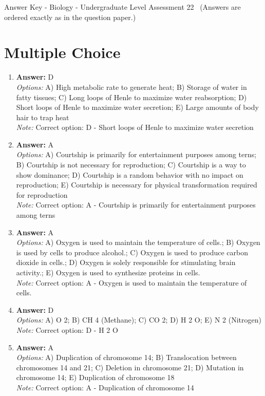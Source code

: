 \documentclass[12pt]{article}
\begin{document}
\begin{center}
Answer Key - Biology - Undergraduate Level Assessment 22 \
\small (Answers are ordered exactly as in the question paper.)
\end{center}

\section*{Multiple Choice}
\begin{enumerate}[label=\arabic*.]
\item \textbf{Answer:} D
\\ \textit{Options:} A) High metabolic rate to generate heat; B) Storage of water in fatty tissues; C) Long loops of Henle to maximize water reabsorption; D) Short loops of Henle to maximize water secretion; E) Large amounts of body hair to trap heat
\\ \textit{Note:} Correct option: D - Short loops of Henle to maximize water secretion
\item \textbf{Answer:} A
\\ \textit{Options:} A) Courtship is primarily for entertainment purposes among terns; B) Courtship is not necessary for reproduction; C) Courtship is a way to show dominance; D) Courtship is a random behavior with no impact on reproduction; E) Courtship is necessary for physical transformation required for reproduction
\\ \textit{Note:} Correct option: A - Courtship is primarily for entertainment purposes among terns
\item \textbf{Answer:} A
\\ \textit{Options:} A) Oxygen is used to maintain the temperature of cells.; B) Oxygen is used by cells to produce alcohol.; C) Oxygen is used to produce carbon dioxide in cells.; D) Oxygen is solely responsible for stimulating brain activity.; E) Oxygen is used to synthesize proteins in cells.
\\ \textit{Note:} Correct option: A - Oxygen is used to maintain the temperature of cells.
\item \textbf{Answer:} D
\\ \textit{Options:} A) O 2; B) CH 4 (Methane); C) CO 2; D) H 2 O; E) N 2 (Nitrogen)
\\ \textit{Note:} Correct option: D - H 2 O
\item \textbf{Answer:} A
\\ \textit{Options:} A) Duplication of chromosome 14; B) Translocation between chromosomes 14 and 21; C) Deletion in chromosome 21; D) Mutation in chromosome 14; E) Duplication of chromosome 18
\\ \textit{Note:} Correct option: A - Duplication of chromosome 14
\end{enumerate}
\end{document}
